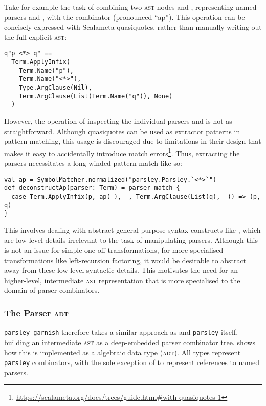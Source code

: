 \documentclass[../../main.tex]{subfiles}
\begin{document}
Take for example the task of combining two \textsc{ast} nodes  and , representing named parsers  and , with the combinator \scala{<*>} (pronounced ``ap'').
This operation can be concisely expressed with Scalameta quasiquotes, rather than manually writing out the full explicit \textsc{ast}:
\begin{verbatim}
q"p <*> q" ==
  Term.ApplyInfix(
    Term.Name("p"),
    Term.Name("<*>"),
    Type.ArgClause(Nil),
    Term.ArgClause(List(Term.Name("q")), None)
  )
\end{verbatim}
However, the  operation of inspecting the individual parsers  and  is not as straightforward.
Although quasiquotes can be used as extractor patterns in pattern matching, this usage is discouraged due to limitations in their design that makes it easy to accidentally introduce match errors\footnote{\url{https://scalameta.org/docs/trees/guide.html#with-quasiquotes-1}}.
Thus, extracting the parsers necessitates a long-winded pattern match like so:
\begin{verbatim}
val ap = SymbolMatcher.normalized("parsley.Parsley.`<*>`")
def deconstructAp(parser: Term) = parser match {
  case Term.ApplyInfix(p, ap(_), _, Term.ArgClause(List(q), _)) => (p, q)
}
\end{verbatim}
This involves dealing with abstract general-purpose syntax constructs like , which are low-level details irrelevant to the task of manipulating parsers.
Although this is not an issue for simple one-off transformations, for more specialised transformations like left-recursion factoring, it would be desirable to abstract away from these low-level syntactic details.
This motivates the need for an higher-level, intermediate \textsc{ast} representation that is more specialised to the domain of parser combinators.

\subsubsection{The Parser \textsc{adt}}
\texttt{parsley-garnish} therefore takes a similar approach as \textcite{baars_leftrec_2004} and \texttt{parsley} itself, building an intermediate \textsc{ast} as a deep-embedded parser combinator tree.
 shows how this is implemented as a  algebraic data type (\textsc{adt}).
All  types represent \texttt{parsley} combinators, with the sole exception of  to represent references to named parsers.
\end{document}
